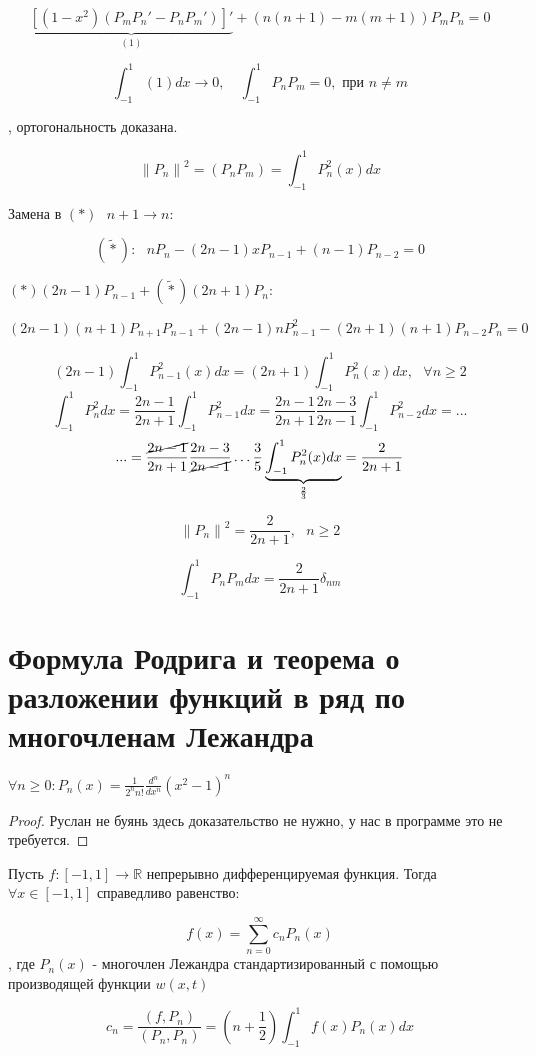 \documentclass[12pt, a4paper]{report}
\begin{document}
\[ \underbrace{[(1 -x ^2 ) (P_m P_n ' - P_n P_m ' )]'}_{(1)} + (n (n +1 ) - m(m+1 )) P_m P_n =0 \] 

\[  \int_{-1 }^{1 }  (1) dx \to 0 , \quad  \int_{-1 }^{1 }  P_n P_m = 0 , \text{ при } n \neq m    \] 

, ортогональность доказана.

\[ \left\lVert P_n   \right\rVert ^2 = (P_n P_m ) = \int_{-1 }^{1 }  P_n  ^2(x) dx  \] 

Замена в \( (*) \text{ }  n+ 1 \to  n \): 

\[ (\tilde{*}): \text{ } n P_n - (2 n -1 ) x P_{n-1 }  +(n-1 ) P_{n-2 }  =0\] 

\( (* ) (2n-1 ) P_{n-1 } +  (\tilde{ * } ) (2n +1 ) P_n: \) 

\[ (2n -1 )(n+1 ) P_{n+1 }  P_{n-1 }  + (2n -1 ) n P_{n-1  }  ^2 - (2n +1 ) (n+1 ) P_{n-2 } P_n =0  \] 

\[ (2n -1 ) \int_{-1 }^{1 }  P_{n-1 }  ^2 ( x ) dx = (2 n +1 ) \int_{-1 }^{1 }  P_n  ^2 (x ) dx , \text{ }  \forall  n \ge 2 \]  
\[ \int_{-1 }^{1 }  P_n ^2 dx = \frac{ 2n -1 }{2n +1 } \int_{-1 }^{1 } P_{n-1  }  ^2 dx = \frac{2n -1 }{2n +1 } \frac{ 2n -3 }{2n -1 } \int_{-1 }^{1 }  P_{n-2 }  ^2 dx = ...    \] 
\[ ... =\frac{\cancel{2n -1} }{2 n+1 } \frac{ 2n-3 }{\cancel{2n -1} } \ldots \frac{3}{5 }  \underbrace{\int_{-1 }^{1 }  P_n ^2 (x ) d x}_{\frac{2}{3} } = \frac{2}{2n +1 }     \] 

\[ \left\lVert P_n  \right\rVert ^2 = \frac{2}{2n +1 }  , \text{ }  n \ge 2  \] 

\[ \int_{-1 }^{1 }  P_n P_m dx   = \frac{2}{2n +1 }  \delta_{nm}  \] 

\section{Формула Родрига и теорема о разложении функций в ряд по  многочленам Лежандра}

\begin{theorem}
    \( \forall       n \ge 0 : \displaystyle  P_n(x ) = \frac{1}{2^n n! }  \frac{d ^n }{d x ^n } ( x ^2 -1 ) ^ n  \) 
\end{theorem}

\begin{proof}
    Руслан не буянь здесь доказательство не нужно, у нас в программе это не требуется.
\end{proof}

\begin{theorem}
    Пусть \( f: [ -1, 1 ] \to  \mathbb{R}    \)  непрерывно дифференцируемая функция. Тогда \( \forall  x \in  [-1 ,1 ]  \)  справедливо равенство: 

    \[ f(x ) = \sum_{n= 0 }^{\infty  } c_n P_n (x)  \] 
    , где \( P_n(x) \) - многочлен Лежандра стандартизированный  с помощью производящей функции \( w(x,t) \) 

    \[ c_n = \frac{(f, P_n )}{(P_n,P_n)}  = \left( n+\frac{1}{2 }  \right) \int_{-1 }^{1 }  f(x ) P_n (x ) dx  \] 
\end{theorem}


\ifdefined\mainfile
\else
    
\end{document}
